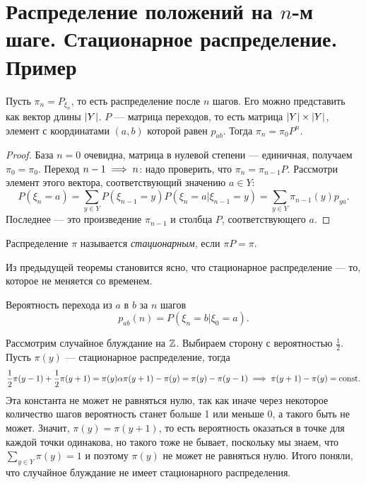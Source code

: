 \section{Распределение положений на $n$-м шаге. Стационарное распределение. Пример}

\begin{theorem}
    Пусть $\pi_n = P_{\xi_n}$, то есть распределение после $n$ шагов. Его можно представить как вектор
    длины $\lvert Y\rvert$. $P$ --- матрица переходов, то есть матрица $\lvert Y\rvert \times \lvert Y\rvert$, элемент с координатами $(a, b)$ которой равен $p_{ab}$. Тогда
    $\pi_n = \pi_0 P^n$.
\end{theorem}

\begin{proof}
    База $n=0$ очевидна, матрица в нулевой степени --- единичная, получаем $\pi_0 = \pi_0$.
    Переход $n - 1\implies n $: надо проверить, что $\pi_n = \pi_{n - 1}P$.
   Рассмотри элемент этого вектора, соответствующий значению $a \in Y$:
    $$P(\xi_n = a) = \underset{y\in Y}{\sum} P(\xi_{n - 1} = y)P(\xi_n = a | \xi_{n - 1} = y) = \underset{y\in Y}{\sum } \pi_{n - 1}(y) p_{ya}.$$
    Последнее --- это произведение $\pi_{n - 1}$ и столбца $P$, соответствующего $a$.
\end{proof}

\begin{definition}
   Распределение $\pi$ называется \textit{стационарным}, если $\pi P = \pi$.
\end{definition}

Из предыдущей теоремы становится ясно, что стационарное распределение --- то, которое не меняется со временем.

\begin{notation}
    Вероятность перехода из $a$ в $b$ за $n$ шагов 
   $$p_{ab}(n) = P(\xi_n = b | \xi_0 = a).$$
\end{notation}


\begin{example} Рассмотрим случайное блуждание на $\mathbb{Z}$.
    Выбираем сторону с вероятностью $\frac{1}{2}$. Пусть $\pi(y)$ --- стационарное распределение, тогда $$\frac{1}{2}\pi(y - 1) + \frac{1}{2}\pi(y+1) =
        \pi(y) \alpha \pi(y + 1) - \pi(y) = \pi(y) - \pi(y - 1)\implies \pi(y + 1) - \pi (y) = \mathrm{const}. $$
    Эта константа не может не равняться нулю, так как иначе через некоторое количество шагов вероятность станет больше 1 или меньше 0, а такого быть не может.
    Значит, $\pi(y) = \pi(y + 1)$, то есть вероятность оказаться в точке для каждой точки одинакова, но такого тоже не бывает, поскольку мы знаем,
    что $\sum_{y\in Y} \pi(y) = 1$ и поэтому $\pi(y)$ не может не равняться нулю.
    Итого поняли, что случайное блуждание не имеет стационарного распределения.
\end{example}